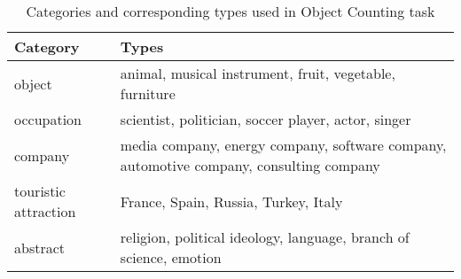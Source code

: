 \begin{table}[ht]
    \centering
    \begin{tabularx}{\linewidth}{@{}p{2.5cm}X@{}}
        \toprule
        \textbf{Category} & \textbf{Types} \\ \midrule
        object & animal, musical instrument, fruit, vegetable, furniture \\ %
        occupation & scientist, politician, soccer player, actor, singer \\ %
        company & media company, energy company, software company, automotive company, consulting company \\ %
        touristic attraction & France, Spain, Russia, Turkey, Italy \\ %
        abstract & religion, political ideology, language, branch of science, emotion \\ %
        \bottomrule
    \end{tabularx}
    \caption{Categories and corresponding types used in Object Counting task}
    \label{tab:categories}
\end{table}